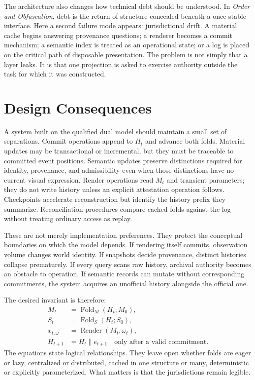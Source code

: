 \documentclass[11pt]{article}
\newcommand{\Fold}{\operatorname{Fold}}
\newcommand{\Render}{\operatorname{Render}}
\begin{document}
The architecture also changes how technical debt should be understood. In \emph{Order and Obfuscation}, debt is the return of structure concealed beneath a once-stable interface. Here a second failure mode appears: jurisdictional drift. A material cache begins answering provenance questions; a renderer becomes a commit mechanism; a semantic index is treated as an operational state; or a log is placed on the critical path of disposable presentation. The problem is not simply that a layer leaks. It is that one projection is asked to exercise authority outside the task for which it was constructed.

\section{Design Consequences}

A system built on the qualified dual model should maintain a small set of separations. Commit operations append to $H_t$ and advance both folds. Material updates may be transactional or incremental, but they must be traceable to committed event positions. Semantic updates preserve distinctions required for identity, provenance, and admissibility even when those distinctions have no current visual expression. Render operations read $M_t$ and transient parameters; they do not write history unless an explicit attestation operation follows. Checkpoints accelerate reconstruction but identify the history prefix they summarize. Reconciliation procedures compare cached folds against the log without treating ordinary access as replay.

These are not merely implementation preferences. They protect the conceptual boundaries on which the model depends. If rendering itself commits, observation volume changes world identity. If snapshots decide provenance, distinct histories collapse prematurely. If every query scans raw history, archival authority becomes an obstacle to operation. If semantic records can mutate without corresponding commitments, the system acquires an unofficial history alongside the official one.

The desired invariant is therefore:
\[
\begin{split}
M_t &= \Fold_M(H_t;M_0),\\
S_t &= \Fold_S(H_t;S_0),\\
x_{t,\omega} &= \Render(M_t,\omega_t),\\
H_{t+1} &= H_t\mathbin{\|}e_{t+1}
\quad\text{only after a valid commitment.}
\end{split}
\]
The equations state logical relationships. They leave open whether folds are eager or lazy, centralized or distributed, cached in one structure or many, deterministic or explicitly parameterized. What matters is that the jurisdictions remain legible.
\end{document}
